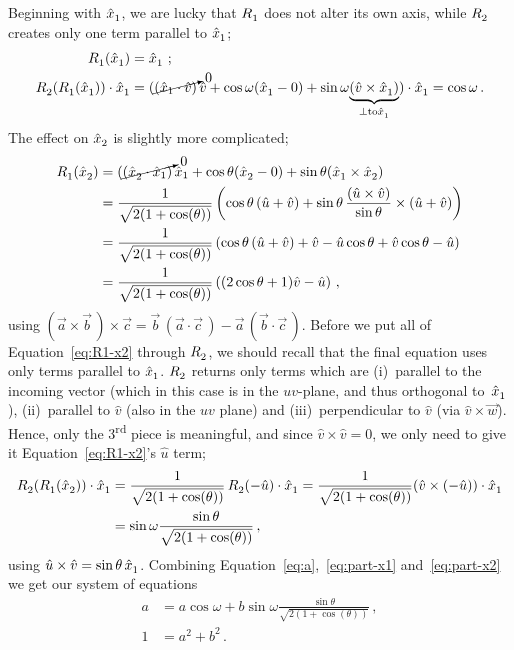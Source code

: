 \documentclass[12pt, nofootinbib, notitlepage]{revtex4}
\newcommand{\vecN}[1]{\hat{#1}}
\newcommand{\vict}{\vec{w}}
\newcommand{\ax}{\vecN{x}}
\newcommand{\super}[2]{#1\textsuperscript{#2}}
\begin{document}
Beginning with $\ax_1\ds$, we are lucky that 
$R_1^{}$ does not alter its own axis, 
while $R_2^{}$ creates only one term parallel to $\ax_1\ds$;
\begin{align}\label{eq:part-x1}
	R_1\ds(\ax_1\ds) & = \ax_1\ds\,
	\,;\\
	R_2\ds(R_1\ds(\ax_1\ds))\cdot\ax_1\ds
	& = (\cancelto{0}{(\ax_1\cdot\vecN{v})}\,\vecN{v}
		+ \cos\omega(\ax_1\ds - 0) 
		+ \sin\omega\underset{\bot\text{ to }\ax_1\ds}{\underbrace
			{(\vecN{v}\times\ax_1\ds)}})\cdot\ax_1\ds = \cos\omega
	\,.
\end{align}
The effect on $\ax_2\ds$ is slightly more complicated;
\begin{align}\label{eq:R1-x2}
	R_1\ds(\ax_2\ds) 
		& = (\cancelto{0}{(\ax_2\ds\cdot\ax_1)}\,\ax_1
		+ \cos\theta(\ax_2\ds - 0) + \sin\theta(\ax_1\ds\times\ax_2\ds)\nonumber\\
		& = \frac{1}{\sqrt{2(1+\cos(\theta))}}
		\left(\cos\theta\,(\vecN{u}+\vecN{v}) 
			+ \sin\theta\,\frac{(\vecN{u}\times\vecN{v})}{\sin\theta}\times(\vecN{u}+\vecN{v})\right)\nonumber\\
		& = \frac{1}{\sqrt{2(1+\cos(\theta))}}
		\left(\cos\theta\,(\vecN{u}+\vecN{v}) + 
		\vecN{v} - \vecN{u}\cos\theta + \vecN{v}\cos\theta - \vecN{u}\right)\nonumber\\
		& = \frac{1}{\sqrt{2(1+\cos(\theta))}}
		\left((2\cos\theta + 1)\vecN{v} - \vecN{u}\right)
	\,,
\end{align}
using ${(\vec{a}\times\vec{b}\,)\times\vec{c} 
	= \vec{b}\,(\vec{a}\cdot\vec{c}\,) - \vec{a}\,(\vec{b}\cdot\vec{c}\,)}$.
Before we put all of Equation~\ref{eq:R1-x2} through $R_2^{}$, 
we should recall that the final equation uses only terms parallel to $\ax_1\ds$. 
$R_2^{}$ returns only terms which are 
(i)~parallel to the incoming vector 
(which in this case is in the $uv$-plane, and thus orthogonal to~$\ax_1\ds$), 
(ii)~parallel to $\vecN{v}$ (also in the $uv$ plane) and 
(iii)~perpendicular to $\vecN{v}$ (via $\vecN{v}\times\vict$).
Hence, only the \super{3}{rd} piece is meaningful, 
and since $\vecN{v}\times\vecN{v}=0$, 
we only need to give it Equation~\ref{eq:R1-x2}'s $\vecN{u}$ term;
\begin{align}\label{eq:part-x2}
	R_2\ds(R_1\ds(\ax_2\ds))\cdot\ax_1\ds
		& = \frac{1}{\sqrt{2(1+\cos(\theta))}} \,R_2\ds(-\vecN{u})\cdot\ax_1\ds
		= \frac{1}{\sqrt{2(1+\cos(\theta))}} (\vecN{v}\times(-\vecN{u}))\cdot\ax_1\ds\nonumber\\
		& = \sin\omega\frac{\sin\theta}{\sqrt{2(1+\cos(\theta))}}
	\,,
\end{align}
using $\vecN{u}\times\vecN{v} = \sin\theta\,\ax_1\ds$.
Combining Equation~\ref{eq:a},~\ref{eq:part-x1} and~\ref{eq:part-x2} 
we get our system of equations
\begin{align}
	a & = a \cos\omega + b\sin\omega\frac{\sin\theta}{\sqrt{2(1+\cos(\theta))}}
	\,,\\
	1 &= a^2 + b^2
	\,.
\end{align}
\end{document}
